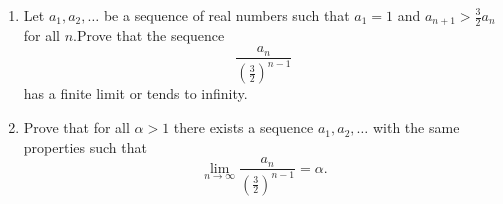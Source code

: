 \documentclass{article}
\begin{document}
\setlength{\parindent}{0pt}
\begin{enumerate}[label=(\alph*)]
\item Let $a_{1},a_{2},\dots$ be a sequence of real numbers such that $a_{1}=1$ and $a_{n+1}>\frac{3}{2}a_{n}$ for all $n$.\newline Prove that the sequence$$\frac{a_{n}}{\left(\frac{3}{2}\right)^{n-1}}$$has a finite limit or tends to infinity.
\item Prove that for all $\alpha>1$ there exists a sequence $a_{1},a_{2},\dots$ with the same properties such that$$\lim_{n\to\infty}\frac{a_{n}}{\left(\frac{3}{2}\right)^{n-1}}=\alpha.$$
\end{enumerate}
\end{document}

